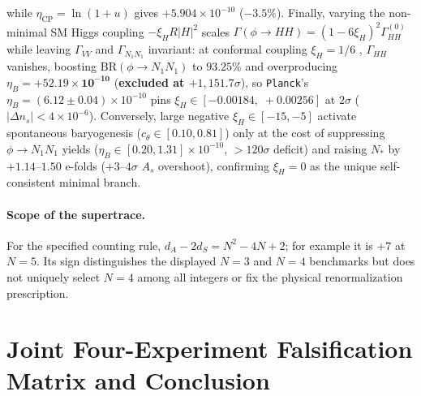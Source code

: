 \documentclass[11pt,a4paper]{article}
\begin{document}
while $\eta_{\mathrm{CP}} = \ln(1 + u)$ gives $+5.904\times 10^{-10}$ ($-3.5\%$). Finally, varying the non-minimal SM Higgs coupling $-\xi_H R|H|^2$ scales $\Gamma(\phi \to HH) = (1 - 6\xi_H)^2\Gamma_{HH}^{(0)}$ while leaving $\Gamma_{VV}$ and $\Gamma_{N_1 N_1}$ invariant: at conformal coupling $\xi_H = 1/6$ \cite{GorbunovTokareva2013}, $\Gamma_{HH}$ vanishes, boosting $\mathrm{BR}(\phi \to N_1 N_1)$ to $\mathbf{93.25\%}$ and overproducing $\eta_B = \mathbf{+52.19\times 10^{-10}}$ (\textbf{excluded at $+1{,}151.7\sigma$}), so \texttt{Planck}'s $\eta_B = (6.12 \pm 0.04)\times 10^{-10}$ pins $\xi_H \in \mathbf{[-0.00184,\; +0.00256]}$ at $2\sigma$ ($|\Delta n_s| < 4\times 10^{-6}$). Conversely, large negative $\xi_H \in [-15, -5]$ activate spontaneous baryogenesis ($c_\theta \in [0.10, 0.81]$) only at the cost of suppressing $\phi \to N_1 N_1$ yields ($\eta_B \in [0.20, 1.31]\times 10^{-10}$, $>120\sigma$ deficit) and raising $N_*$ by $+1.14\text{--}1.50$ e-folds ($+3\text{--}4\sigma$ $A_s$ overshoot), confirming $\xi_H = 0$ as the unique self-consistent minimal branch.

\paragraph{Scope of the supertrace.}
For the specified counting rule, $d_A-2d_S=N^2-4N+2$; for example
it is $+7$ at $N=5$. Its sign distinguishes the displayed $N=3$
and $N=4$ benchmarks but does not uniquely select $N=4$ among all
integers or fix the physical renormalization prescription.

\section{Joint Four-Experiment Falsification Matrix and Conclusion}
\label{sec:conclusion}
\end{document}
